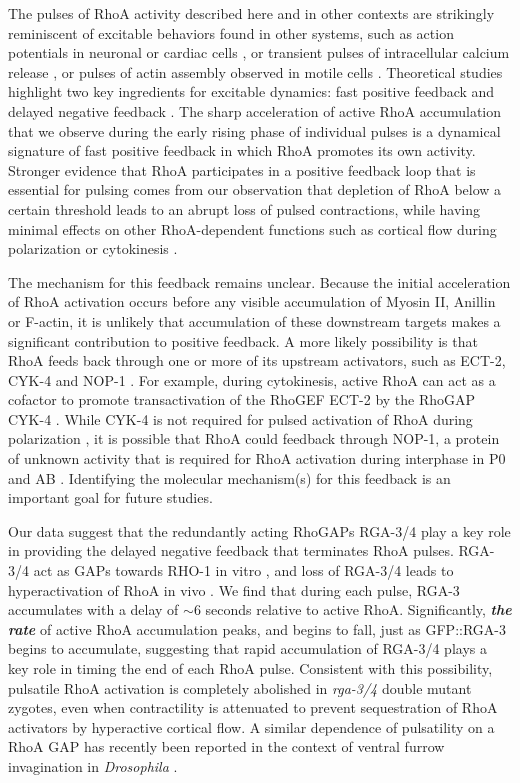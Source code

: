 The pulses of RhoA activity described here and in other contexts \cite{Munjal:2015bx, Bement:2015jp, Mason:2016bs} are strikingly reminiscent of excitable behaviors found in other systems, such as action potentials in neuronal \cite{Izhikevich:2007aa} or cardiac cells \cite{Luo:1991vz}, or transient pulses of intracellular calcium release \cite{Goldbeter:1996aa}, or pulses of actin assembly observed in motile cells \cite{Weiner:2007cl}. Theoretical studies highlight two key ingredients for excitable dynamics: fast positive feedback and delayed negative feedback \cite{Strogatz:1994tz}. The sharp acceleration of active RhoA accumulation that we observe during the early rising phase of individual pulses is a dynamical signature of fast positive feedback in which RhoA promotes its own activity. Stronger evidence that RhoA participates in a positive feedback loop that is essential for pulsing comes from our observation that depletion of RhoA below a certain threshold leads to an abrupt loss of pulsed contractions, while having minimal effects on other RhoA-dependent functions such as cortical flow during polarization\cite{Motegi:2006hi, Schonegg:2006ed} or cytokinesis \cite{Loria:2012ks}. 

The mechanism for this feedback remains unclear.  Because the initial acceleration of RhoA activation occurs before any visible accumulation of Myosin II, Anillin or F-actin, it is unlikely that accumulation of these downstream targets makes a significant contribution to positive feedback.  A more likely possibility is that RhoA feeds back through one or more of its upstream activators, such as ECT-2, CYK-4 and NOP-1 \cite{Tse:2012fp}.  For example, during cytokinesis, active RhoA can act as a cofactor to promote transactivation of the RhoGEF ECT-2 by the RhoGAP CYK-4 \cite{Zhang:2015bx}.  While CYK-4 is not required for pulsed activation of RhoA during polarization \cite{Tse:2012fp}, it is possible that RhoA could feedback through NOP-1, a protein of unknown activity that is required for RhoA activation during interphase in P0 and AB \cite{Tse:2012fp}. Identifying the molecular mechanism(s) for this feedback is an important goal for future studies.


Our data suggest that the redundantly acting RhoGAPs RGA-3/4 play a key role in providing the delayed negative feedback that terminates RhoA pulses. RGA-3/4 act as GAPs towards RHO-1 in vitro \cite{Schonegg:2007if}, and loss of RGA-3/4 leads to hyperactivation of RhoA in vivo \cite{Tse:2012fp}.  We find that during each pulse, RGA-3 accumulates with a delay of $\sim$6 seconds relative to active RhoA. Significantly, \textit{\textbf{the rate}} of active RhoA accumulation peaks, and begins to fall, just as GFP::RGA-3 begins to accumulate, suggesting that rapid accumulation of RGA-3/4 plays a key role in timing the end of each RhoA pulse. Consistent with this possibility, pulsatile RhoA activation is completely abolished in \textit{rga-3/4} double mutant zygotes, even when contractility is attenuated to prevent sequestration of RhoA activators by hyperactive cortical flow.  A similar dependence of pulsatility on a RhoA GAP has recently been reported in the context of ventral furrow invagination in \textit{Drosophila} \cite{Mason:2016bs}.

